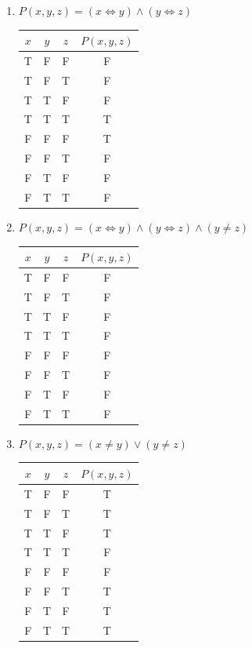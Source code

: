 \documentclass[12pt]{article}
\begin{document}
\begin{enumerate}
\begin{enumerate}
        \item[(f)] \(P(x, y, z) = (x \iff y) \land (y \iff z)\)
        \begin{center}
        \begin{tabular}{ccc|c}
        \(x\) & \(y\) & \(z\) & \(P(x, y, z)\) \\
        \hline
        T & F & F & F \\
        T & F & T & F \\
        T & T & F & F \\
        T & T & T & T \\
        F & F & F & T \\
        F & F & T & F \\
        F & T & F & F \\
        F & T & T & F \\
        \end{tabular}
        \end{center}

        \item[(g)] \(P(x, y, z) = (x \iff y) \land (y \iff z) \land (y \neq z)\)
        \begin{center}
        \begin{tabular}{ccc|c}
        \(x\) & \(y\) & \(z\) & \(P(x, y, z)\) \\
        \hline
        T & F & F & F \\
        T & F & T & F \\
        T & T & F & F \\
        T & T & T & F \\
        F & F & F & F \\
        F & F & T & F \\
        F & T & F & F \\
        F & T & T & F \\
        \end{tabular}
        \end{center}

        \item[(h)] \(P(x, y, z) = (x \neq y) \lor (y \neq z)\)
        \begin{center}
        \begin{tabular}{ccc|c}
        \(x\) & \(y\) & \(z\) & \(P(x, y, z)\) \\
        \hline
        T & F & F & T \\
        T & F & T & T \\
        T & T & F & T \\
        T & T & T & F \\
        F & F & F & F \\
        F & F & T & T \\
        F & T & F & T \\
        F & T & T & T \\
        \end{tabular}
        \end{center}
    \end{enumerate}




\end{enumerate}
\end{document}
